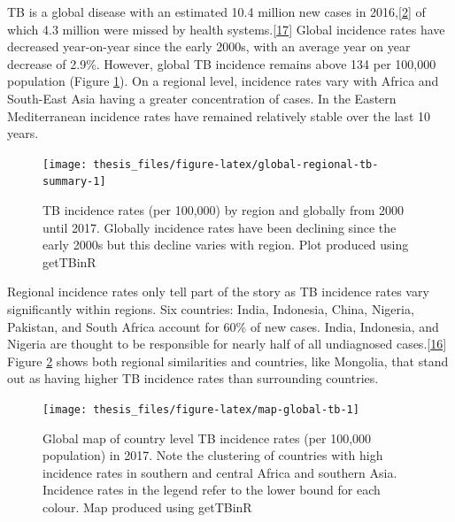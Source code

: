 \documentclass[11pt,twoside]{bristolthesis}
\begin{document}
  TB is a global disease with an estimated 10.4 million new cases in 2016,{[}\protect\hyperlink{ref-TheWorldHealthOrganization:2018va}{2}{]} of which 4.3 million were missed by health systems.{[}\protect\hyperlink{ref-WHO:2018}{17}{]} Global incidence rates have decreased year-on-year since the early 2000s, with an average year on year decrease of 2.9\%. However, global TB incidence remains above 134 per 100,000 population (Figure \ref{fig:global-regional-tb-summary}). On a regional level, incidence rates vary with Africa and South-East Asia having a greater concentration of cases. In the Eastern Mediterranean incidence rates have remained relatively stable over the last 10 years.
  \begin{figure}
  
  {\centering \texttt{[image: thesis\_files/figure-latex/global-regional-tb-summary-1]} 
  
  }
  
  \caption[TB incidence rates (per 100,000) by region and globally from 2000 until 2017.]{TB incidence rates (per 100,000) by region and globally from 2000 until 2017. Globally incidence rates have been declining since the early 2000s but this decline varies with region. Plot produced using getTBinR}\label{fig:global-regional-tb-summary}
  \end{figure}
  Regional incidence rates only tell part of the story as TB incidence rates vary significantly within regions. Six countries: India, Indonesia, China, Nigeria, Pakistan, and South Africa account for 60\% of new cases. India, Indonesia, and Nigeria are thought to be responsible for nearly half of all undiagnosed cases.{[}\protect\hyperlink{ref-WHOTB2016}{16}{]} Figure \ref{fig:map-global-tb} shows both regional similarities and countries, like Mongolia, that stand out as having higher TB incidence rates than surrounding countries.
  \begin{figure}
  
  {\centering \texttt{[image: thesis\_files/figure-latex/map-global-tb-1]} 
  
  }
  
  \caption[Global map of country level TB incidence rates (per 100,000 population) in 201]{Global map of country level TB incidence rates (per 100,000 population) in 2017. Note the clustering of countries with high incidence rates in southern and central Africa and southern Asia. Incidence rates in the legend refer to the lower bound for each colour. Map produced using getTBinR}\label{fig:map-global-tb}
  \end{figure}
\end{document}
